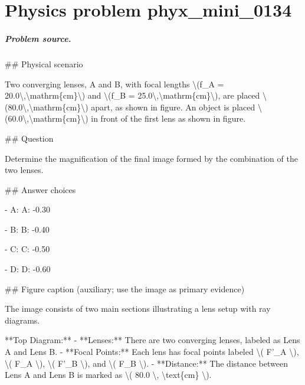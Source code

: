 
\chapter{Physics problem phyx\_mini\_0134}
\label{ch:PhyXMiniProblems_problem_phyx_mini_0134}

\paragraph{Problem source.}
\#\# Physical scenario

Two converging lenses, A and B, with focal lengths \textbackslash{}(f\_A = 20.0\textbackslash{},\textbackslash{}mathrm\{cm\}\textbackslash{}) and \textbackslash{}(f\_B = 25.0\textbackslash{},\textbackslash{}mathrm\{cm\}\textbackslash{}), are placed \textbackslash{}(80.0\textbackslash{},\textbackslash{}mathrm\{cm\}\textbackslash{}) apart, as shown in figure. An object is placed \textbackslash{}(60.0\textbackslash{},\textbackslash{}mathrm\{cm\}\textbackslash{}) in front of the first lens as shown in figure.

\#\# Question

Determine the magnification of the final image formed by the combination of the two lenses.

\#\# Answer choices

- A: A: -0.30

- B: B: -0.40

- C: C: -0.50

- D: D: -0.60

\#\# Figure caption (auxiliary; use the image as primary evidence)

The image consists of two main sections illustrating a lens setup with ray diagrams.

**Top Diagram:**
- **Lenses:** There are two converging lenses, labeled as Lens A and Lens B.
- **Focal Points:** Each lens has focal points labeled \textbackslash{}( F'\_A \textbackslash{}), \textbackslash{}( F\_A \textbackslash{}), \textbackslash{}( F'\_B \textbackslash{}), and \textbackslash{}( F\_B \textbackslash{}). 
- **Distance:** The distance between Lens A and Lens B is marked as \textbackslash{}( 80.0 \textbackslash{}, \textbackslash{}text\{cm\} \textbackslash{}).

